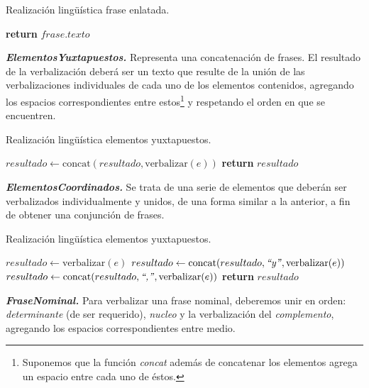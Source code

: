 \begin{algorithm}[H]
\caption{Realización lingüística frase enlatada.}
\begin{algorithmic}[1]
\State \textbf{return} $frase.texto$
\EndFunction
\end{algorithmic}
\end{algorithm}


\medskip
\noindent
\textbf{\emph{ElementosYuxtapuestos.}} Representa una concatenación de frases. El resultado de la verbalización deberá ser un texto que resulte de la unión de las verbalizaciones individuales de cada uno de los elementos contenidos, agregando los espacios correspondientes entre estos\footnote{Suponemos que la función \emph{concat} además de concatenar los elementos agrega un espacio entre cada uno de éstos.} y respetando el orden en que se encuentren. 

\begin{algorithm}[H]
\caption{Realización lingüística elementos yuxtapuestos.} 
\begin{algorithmic}[1]
\State $resultado\gets \text{concat}(resultado, \text{verbalizar}(e))$
\EndFor
\State \textbf{return} $resultado$
\EndFunction
\end{algorithmic}
\end{algorithm}

\medskip
\noindent
\textbf{\emph{ElementosCoordinados.}} Se trata de una serie de elementos que deberán ser verbalizados individualmente y unidos, de una forma similar a la anterior, a fin de obtener una conjunción de frases.

\begin{algorithm}[H]
\caption{Realización lingüística elementos yuxtapuestos.}
\begin{algorithmic}[1]
\State $resultado\gets \text{verbalizar}(e)$
\State $resultado\gets \text{concat}(resultado, \text{\emph{``y''}}, \text{verbalizar}(e))$
\Else
\State $resultado\gets \text{concat}(resultado, \text{\emph{``,''}}, \text{verbalizar}(e))$
\EndIf
\EndFor
\State \textbf{return} $resultado$
\EndFunction
\end{algorithmic}
\end{algorithm}

\medskip
\noindent
\textbf{\emph{FraseNominal.}} Para verbalizar una frase nominal, deberemos unir en orden: \emph{determinante} (de ser requerido), \emph{nucleo} y la verbalización del \emph{complemento}, agregando los espacios correspondientes entre medio.


